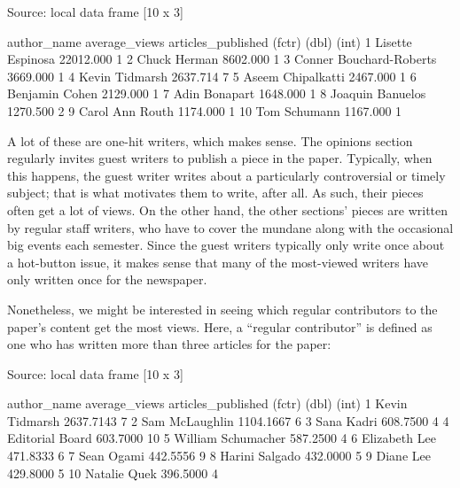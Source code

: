 \documentclass[a4paper]{article}
\begin{document}
\begin{Schunk}
\begin{Soutput}
Source: local data frame [10 x 3]

               author_name average_views articles_published
                    (fctr)         (dbl)              (int)
1         Lisette Espinosa     22012.000                  1
2             Chuck Herman      8602.000                  1
3  Conner Bouchard-Roberts      3669.000                  1
4           Kevin Tidmarsh      2637.714                  7
5        Aseem Chipalkatti      2467.000                  1
6           Benjamin Cohen      2129.000                  1
7            Adin Bonapart      1648.000                  1
8         Joaquin Banuelos      1270.500                  2
9         Carol Ann  Routh      1174.000                  1
10            Tom Schumann      1167.000                  1
\end{Soutput}
\end{Schunk}

A lot of these are one-hit writers, which makes sense. The opinions section regularly invites guest writers to publish a piece in the paper. Typically, when this happens, the guest writer writes about a particularly controversial or timely subject; that is what motivates them to write, after all. As such, their pieces often get a lot of views. On the other hand, the other sections' pieces are written by regular staff writers, who have to cover the mundane along with the occasional big events each semester. Since the guest writers typically only write once about a hot-button issue, it makes sense that many of the most-viewed writers have only written once for the newspaper.

Nonetheless, we might be interested in seeing which regular contributors to the paper's content get the most views. Here, a ``regular contributor'' is defined as one who has written more than three articles for the paper:

\begin{Schunk}
\begin{Soutput}
Source: local data frame [10 x 3]

          author_name average_views articles_published
               (fctr)         (dbl)              (int)
1      Kevin Tidmarsh     2637.7143                  7
2      Sam McLaughlin     1104.1667                  6
3          Sana Kadri      608.7500                  4
4     Editorial Board      603.7000                 10
5  William Schumacher      587.2500                  4
6       Elizabeth Lee      471.8333                  6
7          Sean Ogami      442.5556                  9
8      Harini Salgado      432.0000                  5
9           Diane Lee      429.8000                  5
10       Natalie Quek      396.5000                  4
\end{Soutput}
\end{Schunk}
\end{document}
